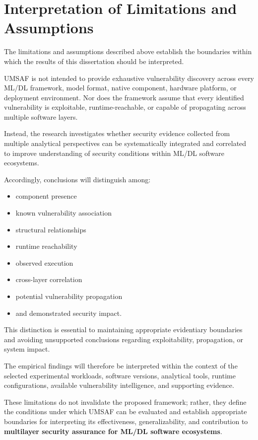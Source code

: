 \documentclass[
  12pt,
  letterpaper,
  oneside]{report}
\providecommand{\tightlist}{%
  \setlength{\itemsep}{0pt}\setlength{\parskip}{0pt}}
\begin{document}
\section{Interpretation of Limitations and Assumptions}\label{133-interpretation-of-limitations-and-assumptions}

The limitations and assumptions described above establish the boundaries
within which the results of this dissertation should be interpreted.

UMSAF is not intended to provide exhaustive vulnerability discovery
across every ML/DL framework, model format, native component, hardware
platform, or deployment environment. Nor does the framework assume that
every identified vulnerability is exploitable, runtime-reachable, or
capable of propagating across multiple software layers.

Instead, the research investigates whether security evidence collected
from multiple analytical perspectives can be systematically integrated
and correlated to improve understanding of security conditions within
ML/DL software ecosystems.

Accordingly, conclusions will distinguish among:

\begin{itemize}
\tightlist
\item
  component presence
\item
  known vulnerability association
\item
  structural relationships
\item
  runtime reachability
\item
  observed execution
\item
  cross-layer correlation
\item
  potential vulnerability propagation
\item
  and demonstrated security impact.
\end{itemize}

This distinction is essential to maintaining appropriate evidentiary
boundaries and avoiding unsupported conclusions regarding
exploitability, propagation, or system impact.

The empirical findings will therefore be interpreted within the context
of the selected experimental workloads, software versions, analytical
tools, runtime configurations, available vulnerability intelligence, and
supporting evidence.

These limitations do not invalidate the proposed framework; rather, they
define the conditions under which UMSAF can be evaluated and establish
appropriate boundaries for interpreting its effectiveness,
generalizability, and contribution to \textbf{multilayer security
assurance for ML/DL software ecosystems}.
\end{document}
